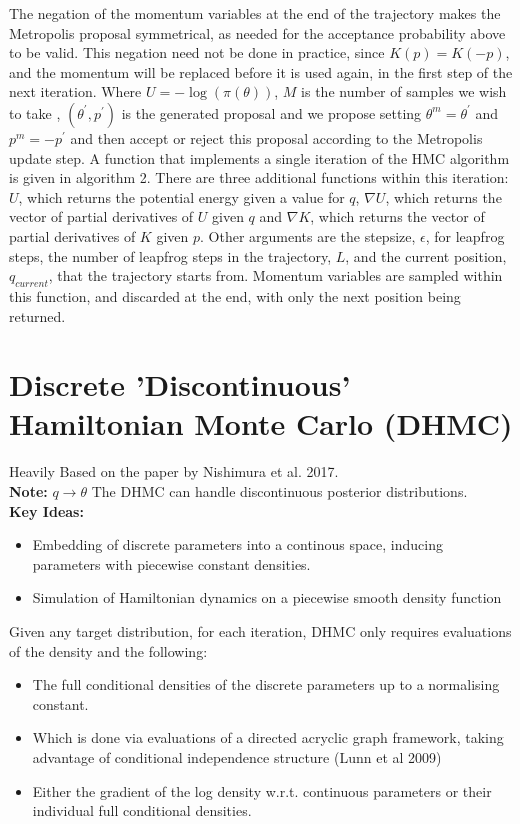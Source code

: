 \documentclass[]{report}
\begin{document}
The negation of the momentum variables at the end of the trajectory makes the Metropolis proposal symmetrical, as needed for the acceptance probability above to be valid. This negation need not be done in practice, since $K(p) = K(-p)$, and the momentum will be replaced before it is used again, in the first step of the next iteration.
Where $U = -\log(\pi(\theta))$,  $M$ is the number of samples we wish to take , $(\theta^{'}, p^{'})$ is the generated proposal and we propose setting $\theta^{m} = \theta^{'}$ and $p^{m} = -p^{'}$ and then accept or reject this proposal according to the Metropolis update step. 
A function that implements a single iteration of the HMC algorithm is given in algorithm 2. There are three additional functions within this iteration: $U$, which returns the potential energy given a value for $q$,  $\nabla U$, which returns the vector of partial derivatives of $U$ given $q$ and $\nabla K$, which returns the vector of partial derivatives of $K$ given $p$. Other arguments are the stepsize, $\epsilon$, for leapfrog steps, the number of leapfrog steps in the trajectory, $L$, and the current position, $q_{current}$, that the trajectory starts from. Momentum variables are sampled within this function, and discarded at the end, with only the next position being returned. 

\section{Discrete 'Discontinuous' Hamiltonian Monte Carlo (DHMC)}

Heavily Based on the paper by Nishimura et al. 2017. \\
\textbf{Note: } $q \rightarrow \theta$
The DHMC can handle discontinuous posterior distributions. 
\\
\textbf{Key Ideas:}
\begin{itemize}
	\item Embedding of discrete parameters into a continous space, inducing parameters with piecewise constant densities. 
	\item Simulation of Hamiltonian dynamics on a piecewise smooth density function
\end{itemize} 
Given any target distribution, for each iteration, DHMC only requires evaluations of the density and the following:
\begin{itemize}
	\item The full conditional densities of the discrete parameters up to a normalising constant. 
	\item Which is done via evaluations of a directed acryclic graph framework, taking advantage of conditional independence structure (Lunn et al 2009)
	\item Either the gradient of the log density w.r.t. continuous parameters or their individual full conditional densities. 
\end{itemize}
\end{document}
